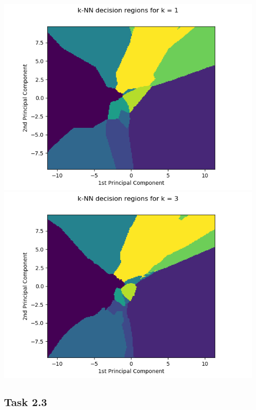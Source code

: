 \documentclass{article}
\begin{document}
\begin{center}
    \includegraphics[trim=3cm 0 0 0, scale=0.5]{images/task2_2_imgs_1.png}
    \includegraphics[trim=0 0 3cm 0, scale=0.5]{images/task2_2_imgs_3.png}
\end{center}


\newpage

\subsection*{Task 2.3}
\end{document}

